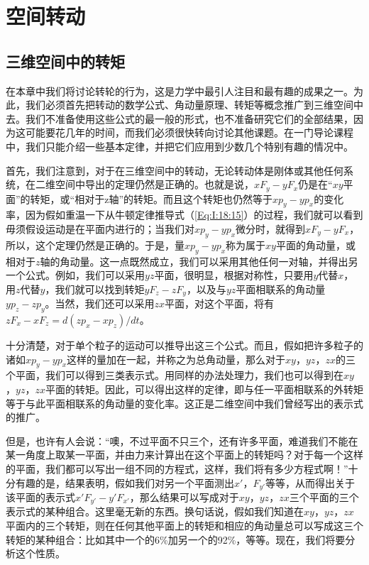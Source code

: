 \chapter{空间转动}

\section{三维空间中的转矩}

在本章中我们将讨论转轮的行为，这是力学中最引人注目和最有趣的成果之一。为此，我们必须首先把转动的数学公式、角动量原理、转矩等概念推广到三维空间中去。我们不准备使用这些公式的最一般的形式，也不准备研究它们的全部结果，因为这可能要花几年的时间，而我们必须很快转向讨论其他课题。在一门导论课程中，我们只能介绍一些基本定律，并把它们应用到少数几个特别有趣的情况中。

首先，我们注意到，对于在三维空间中的转动，无论转动体是刚体或其他任何系统，在二维空间中导出的定理仍然是正确的。也就是说，$xF_y-yF_x$仍是在“$xy$平面”的转矩，或“相对于z轴”的转矩。而且这个转矩也仍然等于$xp_y-yp_x$的变化率，因为假如重温一下从牛顿定律推导式（\ref{Eq:I:18:15}）的过程，我们就可以看到毋须假设运动是在平面内进行的；当我们对$xp_y-yp_x$微分时，就得到$xF_y-yF_x$，所以，这个定理仍然是正确的。于是，量$xp_y-yp_x$称为属于$xy$平面的角动量，或相对于$z$轴的角动量。这一点既然成立，我们可以采用其他任何一对轴，并得出另一个公式。例如，我们可以采用$yz$平面，很明显，根据对称性，只要用$y$代替$x$，用$z$代替$y$，我们就可以找到转矩$yF_z-zF_y$，以及与$yz$平面相联系的角动量$yp_z-zp_y$。当然，我们还可以采用$zx$平面，对这个平面，将有$zF_x-xF_z=d(zp_x-xp_z)/dt$。

十分清楚，对于单个粒子的运动可以推导出这三个公式。而且，假如把许多粒子的诸如$xp_y-yp_x$这样的量加在一起，并称之为总角动量，那么对于$xy$，$yz$，$zx$的三个平面，我们可以得到三类表示式。用同样的办法处理力，我们也可以得到在$xy$，$yz$，$zx$平面的转矩。因此，可以得出这样的定律，即与任一平面相联系的外转矩等于与此平面相联系的角动量的变化率。这正是二维空间中我们曾经写出的表示式的推广。

但是，也许有人会说：“噢，不过平面不只三个，还有许多平面，难道我们不能在某一角度上取某一平面，并由力来计算出在这个平面上的转矩吗？对于每一个这样的平面，我们都可以写出一组不同的方程式，这样，我们将有多少方程式啊！”十分有趣的是，结果表明，假如我们对另一个平面测出$x'$，$F_{y'}$等等，从而得出关于该平面的表示式$x'F_{y'}-y'F_{x'}$，那么结果可以写成对于$xy$，$yz$，$zx$三个平面的三个表示式的某种组合。这里毫无新的东西。换句话说，假如我们知道在$xy$，$yz$，$zx$平面内的三个转矩，则在任何其他平面上的转矩和相应的角动量总可以写成这三个转矩的某种组合：比如其中一个的6\%加另一个的92\%，等等。现在，我们将要分析这个性质。

